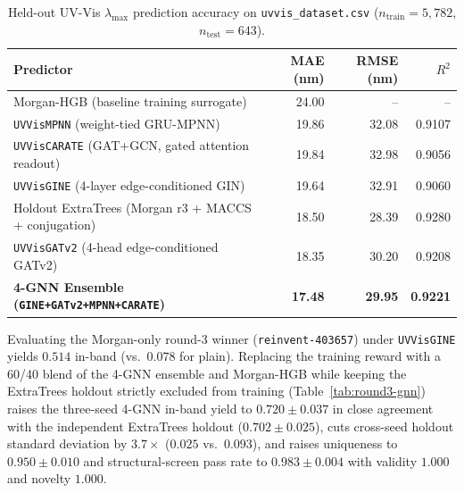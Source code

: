 \documentclass[11pt]{article}
\begin{document}
\begin{table}[t]
\centering
\caption{Held-out UV-Vis $\lambda_{\max}$ prediction accuracy on \texttt{uvvis\_dataset.csv} ($n_{\mathrm{train}}=5{,}782$, $n_{\mathrm{test}}=643$).}
\label{tab:gnn-predictors}
\small
\begin{tabular}{@{}lrrr@{}}
\toprule
Predictor & MAE (nm) & RMSE (nm) & $R^2$ \\
\midrule
Morgan-HGB (baseline training surrogate) & 24.00 & -- & -- \\
\texttt{UVVisMPNN} (weight-tied GRU-MPNN) & 19.86 & 32.08 & 0.9107 \\
\texttt{UVVisCARATE} (GAT+GCN, gated attention readout) & 19.84 & 32.98 & 0.9056 \\
\texttt{UVVisGINE} (4-layer edge-conditioned GIN) & 19.64 & 32.91 & 0.9060 \\
Holdout ExtraTrees (Morgan r3 + MACCS + conjugation) & 18.50 & 28.39 & 0.9280 \\
\texttt{UVVisGATv2} (4-head edge-conditioned GATv2) & 18.35 & 30.20 & 0.9208 \\
\textbf{4-GNN Ensemble (\texttt{GINE+GATv2+MPNN+CARATE})} & \textbf{17.48} & \textbf{29.95} & \textbf{0.9221} \\
\bottomrule
\end{tabular}
\end{table}

Evaluating the Morgan-only round-3 winner (\texttt{reinvent-403657}) under \texttt{UVVisGINE}
yields $0.514$ in-band (vs.\ $0.078$ for plain). Replacing the training reward with a 60/40
blend of the 4-GNN ensemble and Morgan-HGB while keeping the ExtraTrees holdout strictly
excluded from training (Table~\ref{tab:round3-gnn}) raises the three-seed 4-GNN in-band yield
to $0.720 \pm 0.037$ in close agreement with the independent ExtraTrees holdout
($0.702 \pm 0.025$), cuts cross-seed holdout standard deviation by $3.7\times$ ($0.025$ vs.\
$0.093$), and raises uniqueness to $0.950 \pm 0.010$ and structural-screen pass rate to
$0.983 \pm 0.004$ with validity $1.000$ and novelty $1.000$.
\end{document}
